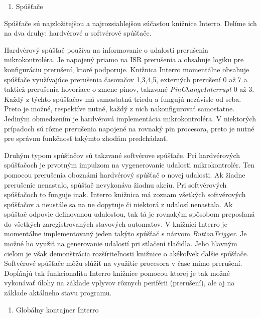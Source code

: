 \begin{enumerate}[resume]
    \item Spúšťače
\end{enumerate}
Spúšťače sú najzložitejšou a najrozsiahlejšou súčasťou knižnice Interro.
Delíme ich na dva druhy: hardvérové a softvérové spúšťače. \par
Hardvérový spúšťač používa na informovanie o udalosti prerušenia mikrokontroléra. Je napojený priamo na ISR prerušenia a obsahuje logiku pre konfiguráciu prerušení,
ktoré podporuje. Knižnica Interro momentálne obsahuje spúšťače využívajúce prerušenia časovačov 1,3,4,5, externých prerušení 0 až 7 a taktiež  prerušenia hovoriace o zmene
pinov, takzvané \textit{PinChangeInterrupt} 0 až 3. Každý z týchto spúšťačov má samostatnú triedu a fungujú nezávisle od seba. Preto je možné, respektíve nutné, každý z nich
nakonfigurovať samostatne. Jediným obmedzením je hardvérová implementácia mikrokontroléra. V niektorých prípadoch sú rôzne prerušenia napojené na rovnaký pin procesora,
preto je nutné pre správnu funkčnosť takýmto zhodám predchádzať. \par

Druhým typom spúšťačov sú takzvané softvérove spúšťače. Pri hardvérových spúšťačoch je prvotným impulzom na vygenerovanie udalosti mikrokontrolér. Ten pomocou prerušenia
oboznámi hardvérový spúšťač o novej udalosti. Ak žiadne prerušenie nenastalo, spúšťač nevykonáva žiadnu akciu. Pri softvérových spúšťačoch to funguje inak. Interro knižnica
má zoznam všetkých softvérových spúšťačov a neustále sa na ne dopytuje či niektorá z udalosí nenastala. Ak spúštač odpovie definovanou udalosťou,
tak tá je rovnakým spôsobom preposlaná do všetkých zaregistrovaných stavových automatov. V knižnici Interro je momentálne implementovaný jeden takýto spúšťač s názvom
\textit{ButtonTrigger}. Je možné ho využiť na generovanie udalostí pri stlačení tlačidla. Jeho hlavným cieľom je však demonštrácia rozšíriteľnosti  knižnice o akékoľvek
ďalšie spúšťače. Softvérové spúšťače môžu slúžiť na využitie procesora v čase mimo prerušení. Dopĺňajú tak funkcionalitu Interro knižnice pomocou ktorej je tak
možné vykonávať úlohy na základe vplyvov rôznych periférii (prerušení), ale aj na základe aktálneho stavu programu. \par

\begin{enumerate}[resume]
    \item Globálny kontajner Interro
\end{enumerate}

